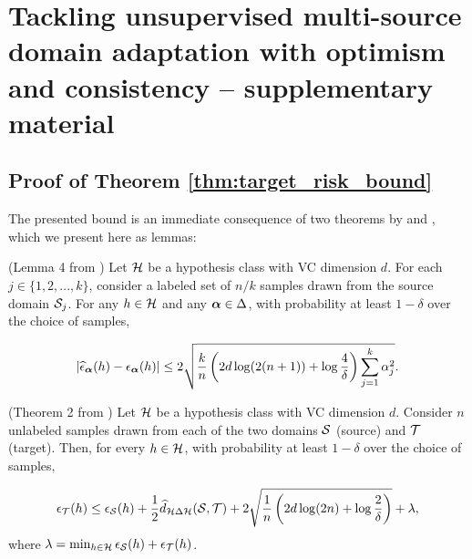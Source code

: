 
\chapter{Tackling unsupervised multi-source domain adaptation with optimism and consistency -- supplementary material} %

\label{appendix:modafm} %

\section{Proof of Theorem \ref{thm:target_risk_bound}}
\label{sec:thm_proof}

The presented bound is an immediate consequence of two theorems by \citet{BenDavid2010} and \citet{Blitzer2008}, which we present here as lemmas:

\begin{lemma}
	\label{lemma:bound_mixture}
	(Lemma 4 from \citet{Blitzer2008}) Let ${\mathcal{H}}$ be a hypothesis class with VC dimension $d$. For each $j \in \{1,2,...,k\}$, consider a labeled set of $n/k$ samples drawn from the source domain ${\mathcal{S}}_j$. For any $h \in {\mathcal{H}}$ and any ${\bm{\alpha}} \in \Delta$, with probability at least $1-\delta$ over the choice of samples,

	\begin{equation}
	|\widehat{\epsilon}_{\bm{\alpha}}(h) - \epsilon_{\bm{\alpha}}(h)| \leq 2\sqrt{\frac{k}{n} \left(2d\log(2(n+1)) + \log \frac{4}{\delta}\right) \sum_{j=1}^k {\alpha}_j^2}.
	\end{equation}
\end{lemma}

\begin{lemma}
	\label{lemma:bound_single_source}
	(Theorem 2 from \citet{BenDavid2010}) Let ${\mathcal{H}}$ be a hypothesis class with VC dimension $d$. Consider $n$ unlabeled samples drawn from each of the two domains ${\mathcal{S}}$ (source) and ${\mathcal{T}}$ (target). Then, for every $h \in {\mathcal{H}}$, with probability at least $1-\delta$ over the choice of samples,

	\begin{equation}
	\epsilon_{\mathcal{T}}(h) \leq \epsilon_{\mathcal{S}}(h) + \frac{1}{2} \widehat{d}_{{\mathcal{H}} \Delta {\mathcal{H}}}({\mathcal{S}}, {\mathcal{T}}) + 2\sqrt{\frac{1}{n} \left( 2d\log(2n) + \log \frac{2}{\delta} \right)} + \lambda,
	\end{equation}
	where $\lambda = \min_{h \in {\mathcal{H}}} \epsilon_{\mathcal{S}}(h) + \epsilon_{\mathcal{T}}(h)$.
\end{lemma}

